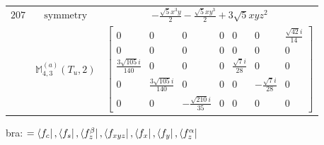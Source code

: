\documentclass[fleqn,8pt,landscape]{jsarticle}
\begin{document}
\begin{longtable}{ccc}
$ 207 $ & $ \text{symmetry} $ & $ - \frac{\sqrt{5} x^{3} y}{2} - \frac{\sqrt{5} x y^{3}}{2} + 3 \sqrt{5} x y z^{2} $ \\
$  $ & $ \mathbb{M}_{4,3}^{(a)}(T_{u},2) $ & $ \begin{bmatrix} 0 & 0 & 0 & 0 & 0 & 0 & \frac{\sqrt{42} i}{14} \\ 0 & 0 & 0 & 0 & 0 & 0 & 0 \\ \frac{3 \sqrt{105} i}{140} & 0 & 0 & 0 & \frac{\sqrt{7} i}{28} & 0 & 0 \\ 0 & \frac{3 \sqrt{105} i}{140} & 0 & 0 & 0 & - \frac{\sqrt{7} i}{28} & 0 \\ 0 & 0 & - \frac{\sqrt{210} i}{35} & 0 & 0 & 0 & 0 \end{bmatrix} $ \\ \hline
\end{longtable}
bra: $=\bra{f_{c}}, \bra{f_{s}}, \bra{f_{z}^{\beta}}, \bra{f_{xyz}}, \bra{f_{x}}, \bra{f_{y}}, \bra{f_{z}^{\alpha}}$
\end{document}
